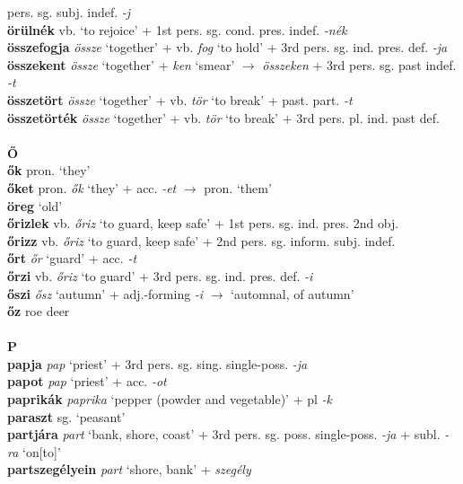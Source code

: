 \documentclass[11pt]{article}
\begin{document}
pers. sg. subj. indef. \emph{-j} \\
\textbf{örülnék} vb. `to rejoice' + 1st
pers. sg. cond. pres. indef. \emph{-nék} \\
\textbf{összefogja} \emph{össze} `together' + vb. \emph{fog}
  `to hold' + 3rd pers. sg. ind. pres. def. \emph{-ja} \\
\textbf{összekent} \emph{össze} `together' + \emph{ken} `smear'
$\rightarrow$ \emph{összeken} + 3rd pers. sg. past indef. \emph{-t} \\
\textbf{összetört} \emph{össze} `together' + vb. \emph{tör} `to break'
+ past. part. \emph{-t} \\
\textbf{összetörték} \emph{össze} `together' + vb. \emph{tör} `to
break' + 3rd pers. pl. ind. past def. \\
\ \\
\noindent \textbf{\large Ő} \\
\textbf{ők} pron. `they' \\
\textbf{őket} pron. \emph{ők} `they' + acc. \emph{-et} $\rightarrow$
pron. `them' \\
\textbf{öreg} `old' \\
\textbf{őrizlek} vb. \emph{őriz} `to guard, keep safe' + 1st pers. sg. ind. pres. 2nd obj. \\
\textbf{őrizz} vb. \emph{őriz} `to guard, keep safe' + 2nd
pers. sg. inform. subj. indef. \\
\textbf{őrt} \emph{őr} `guard' + acc. \emph{-t} \\
\textbf{őrzi} vb. \emph{őriz} `to guard' + 3rd
pers. sg. ind. pres. def. \emph{-i} \\
\textbf{őszi} \emph{ősz} `autumn' + adj.\hyp{}forming \emph{-i}
$\rightarrow$ `automnal, of autumn' \\
\textbf{őz} roe deer \\
\ \\
\noindent \textbf{\large P} \\
\textbf{papja} \emph{pap} `priest' + 3rd
pers. sg. sing. single\hyp{}poss. \emph{-ja} \\
\textbf{papot} \emph{pap} `priest' + acc. \emph{-ot} \\
\textbf{paprikák} \emph{paprika} `pepper (powder and vegetable)' +
pl \emph{-k} \\
\textbf{paraszt} sg. `peasant'\\
\textbf{partjára} \emph{part} `bank, shore, coast' + 3rd
pers. sg. poss. single\hyp{}poss. \emph{-ja} + subl. \emph{-ra}
`on[to]' \\
\textbf{partszegélyein} \emph{part} `shore, bank' + \emph{szegély}
\end{document}
